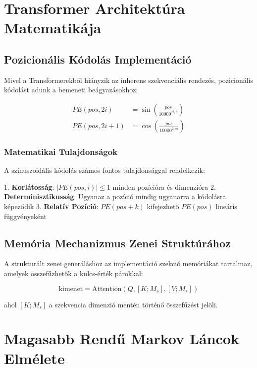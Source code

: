 \section{Transformer Architektúra Matematikája}

\subsection{Pozicionális Kódolás Implementáció}

Mivel a Transformerekből hiányzik az inherens szekvenciális rendezés, pozicionális kódolást adunk a bemeneti beágyazásokhoz:

\begin{align}
PE(pos, 2i) &= \sin\left(\frac{pos}{10000^{2i/d}}\right) \\
PE(pos, 2i+1) &= \cos\left(\frac{pos}{10000^{2i/d}}\right)
\end{align}

\subsubsection{Matematikai Tulajdonságok}

A szinuszoidális kódolás számos fontos tulajdonsággal rendelkezik:

1. \textbf{Korlátosság}: $|PE(pos, i)| \leq 1$ minden pozícióra és dimenzióra
2. \textbf{Determinisztikusság}: Ugyanaz a pozíció mindig ugyanarra a kódolásra képeződik
3. \textbf{Relatív Pozíció}: $PE(pos + k)$ kifejezhető $PE(pos)$ lineáris függvényeként

\subsection{Memória Mechanizmus Zenei Struktúrához}

A strukturált zenei generáláshoz az implementáció szekció memóriákat tartalmaz, amelyek összefűzhetők a kulcs-érték párokkal:

\begin{equation}
\text{kimenet} = \text{Attention}(Q, [K; M_s], [V; M_s])
\end{equation}

ahol $[K; M_s]$ a szekvencia dimenzió mentén történő összefűzést jelöli.

\section{Magasabb Rendű Markov Láncok Elmélete}

